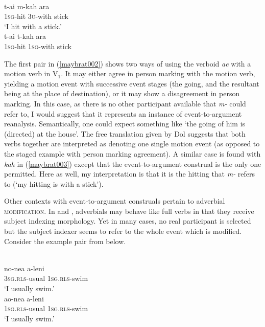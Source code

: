\newpage

\ea \label{maybrat003}
\\
\ea
\gll t-ai m-kah ara \\
1\textsc{sg}-hit 3\textsc{u}-with stick \\
\glft `I hit with a stick.' \\ 
\ex
\gll *t-ai t-kah ara \\ 
1\textsc{sg}-hit 1\textsc{sg}-with stick \\
\z
\z

The first pair in (\ref{maybrat002}) shows two ways of using the verboid \textit{ae} with a motion verb in V$_1$. It may either agree in person marking with the motion verb, yielding a motion event with successive event stages (the going, and the resultant being at the place of destination), or it may show a disagreement in person marking. In this case, as there is no other participant available that \textit{m-} could refer to, I would suggest that it represents an instance of event-to-argument reanalysis. Semantically, one could expect something like `the going of him is (directed) at the house'. The free translation given by Dol suggests that both verbs together are interpreted as denoting one single motion event (as opposed to the staged example with person marking agreement). A similar case is found with \textit{kah} in (\ref{maybrat003}) except that the event-to-argument construal is the only one permitted. Here as well, my interpretation is that it is the hitting that \textit{m-} refers to (`my hitting is with a stick').

Other contexts with event-to-argument construals pertain to adverbial \textsc{modification}. In  and , adverbials may behave like full verbs in that they receive subject indexing morphology. Yet in many cases, no real participant is selected but the subject indexer seems to refer to the whole event which is modified. Consider the example pair from  below.

\ea \label{muna003}
\\
\ea
\gll no-nea a-leni \\
3\textsc{sg}.\textsc{rls}-usual 1\textsc{sg}.\textsc{rls}-swim \\
\glft `I usually swim.' \\ 
\ex
\gll ao-nea a-leni \\ 
1\textsc{sg}.\textsc{rls}-usual 1\textsc{sg}.\textsc{rls}-swim \\
\glft `I usually swim.' \\ 
\z
\z

